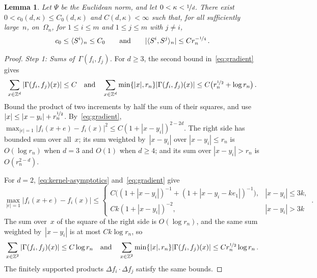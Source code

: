 \documentclass[11pt]{amsart}
\theoremstyle{plain}
\newtheorem{lemma}[theorem]{Lemma}
\theoremstyle{definition}
\newcommand{\Z}{\mathbb Z}
\newcommand{\drift}{\kappa}
\newcommand{\gauge}{\Psi}
\newcommand{\nf}{\nicefrac}
\numberwithin{equation}{section}
\begin{document}
\begin{lemma}\label{lem:separated-brackets}
Let $\gauge$ be the Euclidean norm, and let $0<\drift<\nf1d$. There exist $0<c_0(d,\drift)\leq C_0(d,\drift)$ and $C(d,\drift)<\infty$ such that, for all sufficiently large~$n$, on~$\Omega_n$, for $1\leq i\leq m$ and $1\leq j\leq m$ with $j\neq i$,
\begin{equation*}
c_0\leq\langle S^i\rangle_n\leq C_0
\qquad\text{and}\qquad
|\langle S^i,S^j\rangle_n|\leq Cr_n^{-\nf14}\, .
\end{equation*}
\end{lemma}

\begin{proof}
\emph{Step 1: Sums of~$\Gamma(f_i,f_j)$.} For $d\geq3$, the second bound in~\eqref{eq:gradient} gives
\begin{equation*}
\sum_{x\in\Z^d}|\Gamma(f_i,f_j)(x)|\leq C
\quad\text{and}\quad
\sum_{x\in\Z^d}\min\{|x|,r_n\}|\Gamma(f_i,f_j)(x)|\leq C\bigl(r_n^{\nf12}+\log r_n\bigr)\, .
\end{equation*}
Bound the product of two increments by half the sum of their squares, and use $|x|\leq|x-y_i|+r_n^{\nf12}$. By~\eqref{eq:gradient}, $\max_{|e|=1}|f_i(x+e)-f_i(x)|^2\leq C(1+|x-y_i|)^{2-2d}$. The right side has bounded sum over all~$x$; its sum weighted by~$|x-y_i|$ over $|x-y_i|\leq r_n$ is $O(\log r_n)$ when $d=3$ and $O(1)$ when $d\geq4$; and its sum over $|x-y_i|>r_n$ is $O(r_n^{2-d})$.

For $d=2$, \eqref{eq:kernel-asymptotics} and~\eqref{eq:gradient} give
\begin{equation*}
\max_{|e|=1}|f_i(x+e)-f_i(x)|\leq\begin{cases}
C\bigl((1+|x-y_i|)^{-1}+(1+|x-y_i-ke_1|)^{-1}\bigr),&|x-y_i|\leq3k,\\
Ck(1+|x-y_i|)^{-2},&|x-y_i|>3k
\end{cases}\, .
\end{equation*}
The sum over~$x$ of the square of the right side is $O(\log r_n)$, and the same sum weighted by~$|x-y_i|$ is at most $Ck\log r_n$, so
\begin{equation*}
\sum_{x\in\Z^2}|\Gamma(f_i,f_j)(x)|\leq C\log r_n
\quad\text{and}\quad
\sum_{x\in\Z^2}\min\{|x|,r_n\}|\Gamma(f_i,f_j)(x)|\leq Cr_n^{\nf12}\log r_n\, .
\end{equation*}
The finitely supported products $\Delta f_i\cdot\Delta f_j$ satisfy the same bounds.


\end{proof}
\end{document}
